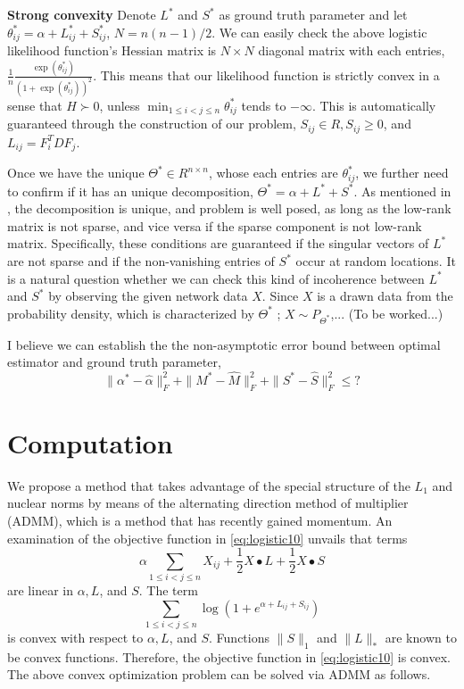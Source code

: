 \documentclass{article}
\begin{document}
\noindent \textbf{Strong convexity} Denote $L^*$ and $S^*$ as ground truth parameter and let $\theta^*_{ij}=\alpha+L^*_{ij}+S^*_{ij}$, $N=n(n-1)/2$. We can easily check the above logistic likelihood function's Hessian matrix is $N \times N$ diagonal matrix with each entries, $\frac{1}{n}\frac{\exp(\theta^*_{ij})}{(1+\exp(\theta^*_{ij}))^2}$. This means that our likelihood function is strictly convex in a sense that $H \succ 0$, unless $\min_{1\le i< j\le n}\theta^*_{ij}$ tends to $-\infty$. 
This is automatically guaranteed through the construction of our problem, $S_{ij} \in R, S_{ij} \geq 0$, and $L_{ij} = F^T_{i}DF_{j}$.

Once we have the unique $\Theta^* \in R^{n \times n}$, whose each entries are $\theta^*_{ij}$, we further need to confirm if it has an unique decomposition, $\Theta^*=\alpha+L^*+S^*$.
As mentioned in \cite{candes2011robust}, the decomposition is unique, and problem is well posed, as long as the low-rank matrix is not sparse, and vice versa if the sparse component is not low-rank matrix. Specifically, these conditions are guaranteed if the singular vectors of $L^*$ are not sparse and if the non-vanishing entries of $S^*$ occur at random locations. 
It is a natural question whether we can check this kind of incoherence between $L^*$ and $S^*$ by observing the given network data $X$. Since 
$X$ is a drawn data from the probability density, which is characterized by $\Theta^*$ ; $X\sim{P_{\Theta^*}}$,... (To be worked...)

I believe we can establish the the non-asymptotic error bound between optimal estimator and ground truth parameter,
\[
    \|\alpha^*-\hat{\alpha}\|_{F}^{2} + 
    \|M^*-\hat{M}\|_{F}^{2} +
    \|S^*-\hat{S}\|_{F}^{2} \leq  ?
\]


\section{Computation}
\label{sec:compute}

We propose a method that takes advantage of the special structure
of the $L_1$ and nuclear norms by means of the
alternating direction method of multiplier (ADMM), which is a method
that has recently gained momentum.
An examination of the objective function in \eqref{eq:logistic10} unvails that
terms
\[
\alpha \sum_{1\le i< j\le n}X_{ij} +\frac{1}{2} X \bullet L +\frac{1}{2} X \bullet S
\]
are linear in $\alpha,  L$, and $S$.
The term
\[
\sum_{1\le i<j\le n} \log \left(1 + e^{\alpha + L_{ij} +S_{ij}}\right)
\]
is convex with respect to $\alpha,  L$, and $S$.
Functions $\|S\|_1$ and $\|L\|_\ast$ are known to be convex functions.
Therefore, the objective function in \eqref{eq:logistic10} is convex. The above convex optimization problem can be solved via ADMM as follows.
\end{document}
